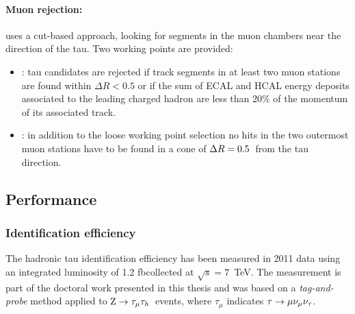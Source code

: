 \paragraph{Muon rejection:} uses a cut-based approach, looking for segments in the muon chambers near the direction of %
the tau. Two working points are provided:

\begin{itemize}
\item {}: tau candidates are rejected if track segments in at least two muon stations are found within $\Delta R < 0.5$ or if the sum of ECAL and HCAL energy deposits associated to the leading charged hadron are less than 20\% of the momentum of its associated track.
\item {}: in addition to the loose working point selection no hits in the two outermost muon stations have to be found in a cone of $\Delta R = 0.5$\ from the tau direction.
\end{itemize}

\subsection{Performance}

\subsubsection{Identification efficiency}
\label{sec:tauid_eff}
The hadronic tau identification efficiency has been measured in 2011 data using an integrated luminosity of 1.2 fb\Inv collected at $\sqrt{s}=7$~TeV. 
The measurement is part of the doctoral work presented in this thesis and was based on a \emph{tag-and-probe} method applied to $\mathrm{Z}\rightarrow\tau_\mu\tau_h$\ events, where $\tau_\mu$ indicates $\tau\rightarrow\mu\nu_\mu\nu_\tau$. 

